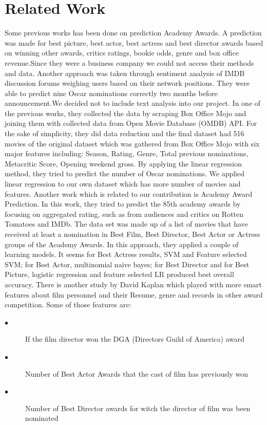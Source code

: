 \documentclass[journal,transmag]{IEEEtran}
\begin{document}
	\section{Related Work}
Some previous works has been done on prediction Academy Awards. A prediction was made for best picture, best actor, best actress and best director awards based on winning other awards, critics ratings, bookie odds, genre and box office revenue\cite{ref1}.Since they were a business company we could not access their methods and data.
Another approach was taken through sentiment analysis of IMDB discussion forums weighing users based on their network positions. They were able to predict nine Oscar nominations correctly two months before announcement\cite{ref2}.We decided not to include text analysis into our project.
In one of the previous works, they collected the data by scraping Box Office Mojo and joining them with collected data from Open Movie Database (OMDB) API. For the sake of simplicity, they did data reduction and the final dataset had 516 movies of the original dataset which was gathered from Box Office Mojo with six major features including: Season, Rating, Genre, Total previous nominations, Metacritic Score, Opening weekend gross. By applying the linear regression method, they tried to predict the number of Oscar nominations\cite{ref3}. We applied linear regression to our own dataset which has more number of movies and features.
Another work which is related to our contribution is Academy Award Prediction. In this work, they tried to predict the 85th academy awards by focusing on aggregated rating, such as from audiences and critics on Rotten Tomatoes and IMDb. The data set was made up of a list of movies that have received at least a nomination in Best Film, Best Director, Best Actor or Actress groups of the Academy Awards. In this approach, they applied a couple of learning models. It seems for Best Actress results, SVM and Feature selected SVM; for Best Actor, multinomial naive bayes; for Best Director and for Best Picture, logistic regression and feature selected LR produced best overall accuracy\cite{ref4}.
There is another study by David Kaplan which played with more smart features about film personnel and their Resume, genre and records in other award competition. Some of those features are:
\begin{description}
  \item[$\bullet$ ] If the film director won the DGA (Directors Guild of America) award
  \item[$\bullet$ ] Number of Best Actor Awards that the cast of film has previously won
  \item[$\bullet$] Number of Best Director awards for witch the director of film was been nominated
\end{description}
\end{document}
